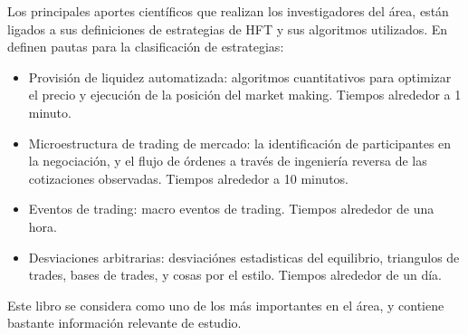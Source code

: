 Los principales aportes científicos que realizan los investigadores del área, están ligados a sus definiciones de estrategias de HFT y sus algoritmos utilizados. En
\cite{aldridge2009high} definen pautas para la clasificación de estrategias:
\begin{itemize}
	\item Provisión de liquidez automatizada: algoritmos cuantitativos para optimizar el precio y ejecución de la posición del market making. Tiempos alrededor a
		1 minuto.
	\item Microestructura de trading de mercado: la identificación de participantes en la negociación, y el flujo de órdenes a través de ingeniería reversa de 
		las cotizaciones observadas. Tiempos alrededor a 10 minutos.
	\item Eventos de trading: macro eventos de trading. Tiempos alrededor de una hora.
	\item Desviaciones arbitrarias: desviaciónes estadisticas del equilibrio, triangulos de trades, bases de trades, y cosas por el estilo. Tiempos alrededor
		de un día.
\end{itemize}

Este libro se considera como uno de los más importantes en el área, y contiene bastante información relevante de estudio.
